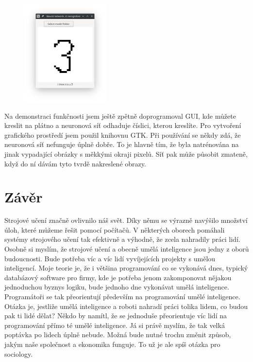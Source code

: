 \documentclass[a4paper,11pt, oneside]{book} \usepackage[czech]{babel}
\begin{document}
	\begin{figure} %
		\centering
		\includegraphics[width=0.4\textwidth]{img/neural-network-digit-gui.png}
	\end{figure}

	Na demonstraci funkčnosti jsem ještě zpětně doprogramoval GUI, kde můžete kreslit
	na plátno a neuronová síť odhaduje číslici, kterou kreslíte. Pro vytvoření
	grafického prostředí jsem použil knihovnu GTK. Při používání se někdy zdá, že neuronová
	síť nefunguje úplně dobře. To je hlavně tím, že byla natrénována na jinak vypadající
	obrázky s měkkými okraji pixelů. Síť pak může působit zmateně, když do ní dávám
	tyto tvrdě nakreslené obrazy.













	\chapter{Závěr}

	Strojové učení značně ovlivnilo náš svět. Díky němu se výrazně navýšilo množství úloh, které
	můžeme řešit pomocí počítačů. V některých oborech pomáhali systémy strojového učení
	tak efektivně a výhodně, že zcela nahradily práci lidí. Osobně si myslím, že strojové učení
	a obecně umělá inteligence jsou jedny z oborů budoucnosti. Bude potřeba víc a víc lidí vyvíjejících
	projekty s umělou inteligencí. Moje teorie je, že i většina programování co se vykonává dnes,
	typický databázový software pro firmy, kde je potřeba jenom zakomponovat nějakou jednoduchou
	byznys logiku, bude jednoho dne vykonávat umělá inteligence. Programátoři se tak přeorientují
	především na programování umělé inteligence. Otázka je, jestliže umělá inteligence
	a roboti nahradí práci tolika lidem, co budou pak ti lidé dělat? Někdo by namítl, že se jednoduše
	přeorientuje víc lidí na programování přímo té umělé inteligence. Já si právě myslím, že tak
	velká poptávka po lidech úplně nebude. Možná bude nutné
	trochu změnit způsob, jakým naše společnost a ekonomika funguje. To už je ale spíš otázka pro sociology.
\end{document}
